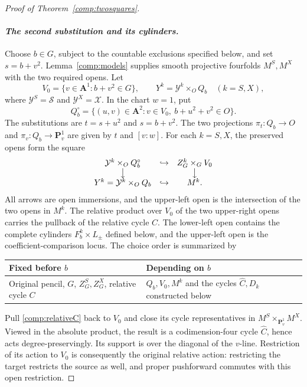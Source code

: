 \documentclass[11pt]{amsart}
\newcommand{\PP}{\mathbf P}
\renewcommand{\AA}{\mathbf A}
\theoremstyle{definition}
\theoremstyle{remark}
\numberwithin{equation}{section}
\begin{document}
\begin{proof}[Proof of Theorem~\ref{comp:twosquares}]
\paragraph{\emph{The second substitution and its cylinders.}}
Choose $b\in G$, subject to the countable exclusions specified below,
and set $s=b+v^2$.  Lemma~\ref{comp:models} supplies smooth projective
fourfolds $M^S,M^X$ with the two required opens.  Let
\[
 V_0=\{v\in\AA^1:b+v^2\in G\},\qquad
 Y^k=\mathcal Y^k\times_OQ_b\quad(k=S,X),
\]
where $\mathcal Y^S=\mathcal S$ and $\mathcal Y^X=\mathcal X$.
In the chart $w=1$, put
\[
 Q_b^\circ=\{(u,v)\in\AA^2:v\in V_0,\ b+u^2+v^2\in O\}.
\]
The substitutions are $t=s+u^2$ and $s=b+v^2$.  The two projections
$\pi_t:Q_b\to O$ and $\pi_v:Q_b\to\PP^1_v$ are given by $t$ and
$[v:w]$.  For each $k=S,X$, the preserved opens form the square
\[
 \begin{array}{ccc}
 \mathcal Y^k\times_OQ_b^\circ &\hookrightarrow& Z_G^k\times_GV_0\\
 \big\downarrow && \big\downarrow\\
 Y^k=\mathcal Y^k\times_OQ_b &\hookrightarrow& M^k.
 \end{array}
\]
All arrows are open immersions, and the upper-left open is the
intersection of the two opens in $M^k$.  The relative product over $V_0$
of the two upper-right opens carries the pullback of the relative cycle
$C$.  The lower-left open contains the complete cylinders
$F_b^k\times L_\pm$ defined below, and the upper-left open is the
coefficient-comparison locus.  The choice order is
summarized by
\begin{center}
\small
\begin{tabular}{@{}p{.45\linewidth}p{.45\linewidth}@{}}
\toprule
Fixed before $b$ & Depending on $b$\\
\midrule
Original pencil, $G$, $Z_G^S,Z_G^X$, relative cycle $C$
& $Q_b,V_0,M^k$ and the cycles $\widehat C,D_k$ constructed below\\
\bottomrule
\end{tabular}
\end{center}
Pull \eqref{comp:relativeC} back to $V_0$ and close its cycle
representatives in $M^S\times_{\PP^1_v}M^X$.  Viewed in the absolute
product, the result is a codimension-four cycle $\widehat C$, hence acts
degree-preservingly.  Its support is over the diagonal of the $v$-line.
Restriction of its action to $V_0$ is consequently the original relative
action: restricting the target restricts the source as well, and proper
pushforward commutes with this open restriction.


\end{proof}
\end{document}
